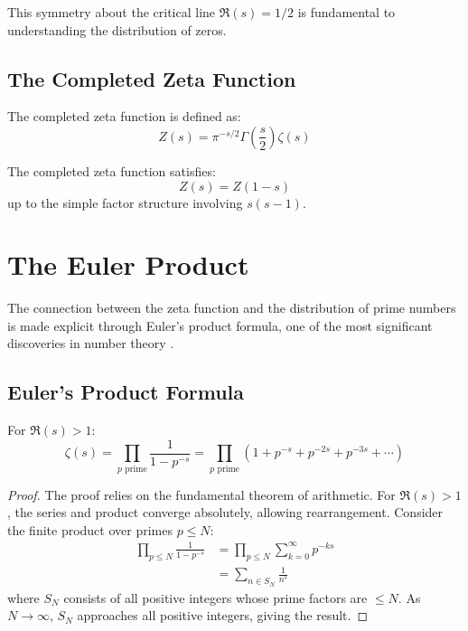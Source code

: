This symmetry about the critical line $\Re(s) = 1/2$ is fundamental to understanding the distribution of zeros.

\subsection{The Completed Zeta Function}

\begin{definition}
\label{def:completed_zeta}
The completed zeta function is defined as:
\begin{equation}
Z(s) = \pi^{-s/2} \Gamma\left(\frac{s}{2}\right) \zeta(s)
\label{eq:completed_zeta}
\end{equation}
\end{definition}

\begin{theorem}
The completed zeta function satisfies:
\begin{equation}
Z(s) = Z(1-s)
\end{equation}
up to the simple factor structure involving $s(s-1)$.
\end{theorem}

\section{The Euler Product}
\label{sec:euler_product}

The connection between the zeta function and the distribution of prime numbers is made explicit through Euler's product formula, one of the most significant discoveries in number theory \cite{edwards1974,titchmarsh1986}.

\subsection{Euler's Product Formula}

\begin{theorem}
\label{thm:euler_product}
For $\Re(s) > 1$:
\begin{equation}
\zeta(s) = \prod_{p \text{ prime}} \frac{1}{1-p^{-s}} = \prod_{p \text{ prime}} \left(1 + p^{-s} + p^{-2s} + p^{-3s} + \cdots\right)
\label{eq:euler_product}
\end{equation}
\end{theorem}

\begin{proof}
The proof relies on the fundamental theorem of arithmetic. For $\Re(s) > 1$, the series and product converge absolutely, allowing rearrangement. Consider the finite product over primes $p \leq N$:
\begin{align}
\prod_{p \leq N} \frac{1}{1-p^{-s}} &= \prod_{p \leq N} \sum_{k=0}^{\infty} p^{-ks} \\
&= \sum_{n \in S_N} \frac{1}{n^s}
\end{align}
where $S_N$ consists of all positive integers whose prime factors are $\leq N$. As $N \to \infty$, $S_N$ approaches all positive integers, giving the result.
\end{proof}

